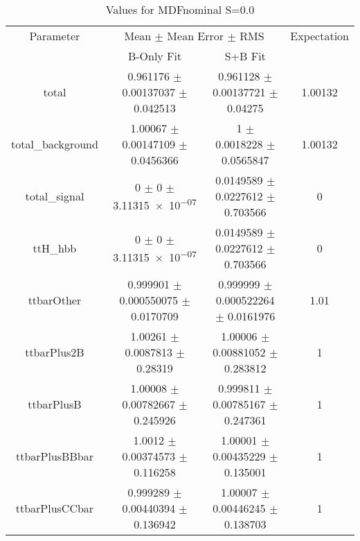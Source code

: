 \begin{table}
\centering
\caption{Values for MDFnominal S=0.0}
\begin{tabular}{cccc}
\toprule
Parameter & \multicolumn{2}{c}{Mean $\pm$ Mean Error $\pm$ RMS} & Expectation\\
 & B-Only Fit & S+B Fit & \\
\midrule
total & \num{0.961176} $\pm$ \num{0.00137037} $\pm$ \num{0.042513} & \num{0.961128} $\pm$ \num{0.00137721} $\pm$ \num{0.04275} & \num{1.00132}\\
total\_background & \num{1.00067} $\pm$ \num{0.00147109} $\pm$ \num{0.0456366} & \num{1} $\pm$ \num{0.0018228} $\pm$ \num{0.0565847} & \num{1.00132}\\
total\_signal & \num{0} $\pm$ \num{0} $\pm$ \num{3.11315e-07} & \num{0.0149589} $\pm$ \num{0.0227612} $\pm$ \num{0.703566} & \num{0}\\
ttH\_hbb & \num{0} $\pm$ \num{0} $\pm$ \num{3.11315e-07} & \num{0.0149589} $\pm$ \num{0.0227612} $\pm$ \num{0.703566} & \num{0}\\
ttbarOther & \num{0.999901} $\pm$ \num{0.000550075} $\pm$ \num{0.0170709} & \num{0.999999} $\pm$ \num{0.000522264} $\pm$ \num{0.0161976} & \num{1.01}\\
ttbarPlus2B & \num{1.00261} $\pm$ \num{0.0087813} $\pm$ \num{0.28319} & \num{1.00006} $\pm$ \num{0.00881052} $\pm$ \num{0.283812} & \num{1}\\
ttbarPlusB & \num{1.00008} $\pm$ \num{0.00782667} $\pm$ \num{0.245926} & \num{0.999811} $\pm$ \num{0.00785167} $\pm$ \num{0.247361} & \num{1}\\
ttbarPlusBBbar & \num{1.0012} $\pm$ \num{0.00374573} $\pm$ \num{0.116258} & \num{1.00001} $\pm$ \num{0.00435229} $\pm$ \num{0.135001} & \num{1}\\
ttbarPlusCCbar & \num{0.999289} $\pm$ \num{0.00440394} $\pm$ \num{0.136942} & \num{1.00007} $\pm$ \num{0.00446245} $\pm$ \num{0.138703} & \num{1}\\
\bottomrule
\end{tabular}
\end{table}